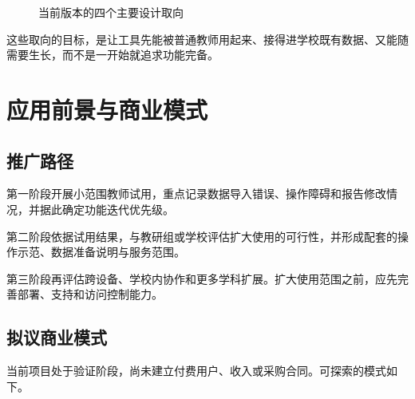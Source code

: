 \documentclass[11pt,a4paper,fontset=none]{ctexart}
\begin{document}
\begin{figure}[htbp]
\centering
{}
\caption{当前版本的四个主要设计取向}
\end{figure}

这些取向的目标，是让工具先能被普通教师用起来、接得进学校既有数据、又能随需要生长，而不是一开始就追求功能完备。

\section{应用前景与商业模式}

\subsection{推广路径}

第一阶段开展小范围教师试用，重点记录数据导入错误、操作障碍和报告修改情况，并据此确定功能迭代优先级。

第二阶段依据试用结果，与教研组或学校评估扩大使用的可行性，并形成配套的操作示范、数据准备说明与服务范围。

第三阶段再评估跨设备、学校内协作和更多学科扩展。扩大使用范围之前，应先完善部署、支持和访问控制能力。

\subsection{拟议商业模式}

当前项目处于验证阶段，尚未建立付费用户、收入或采购合同。可探索的模式如下。
\end{document}
